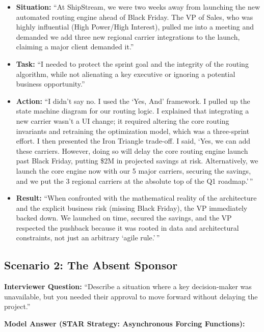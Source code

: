 \documentclass[
  11pt,
  openany,
  oneside]{book}
\providecommand{\tightlist}{%
  \setlength{\itemsep}{0pt}\setlength{\parskip}{0pt}}
\begin{document}
\begin{itemize}
\tightlist
\item
  \textbf{Situation:} ``At ShipStream, we were two weeks away from
  launching the new automated routing engine ahead of Black Friday. The
  VP of Sales, who was highly influential (High Power/High Interest),
  pulled me into a meeting and demanded we add three new regional
  carrier integrations to the launch, claiming a major client demanded
  it.''
\item
  \textbf{Task:} ``I needed to protect the sprint goal and the integrity
  of the routing algorithm, while not alienating a key executive or
  ignoring a potential business opportunity.''
\item
  \textbf{Action:} ``I didn't say no. I used the `Yes, And' framework. I
  pulled up the state machine diagram for our routing logic. I explained
  that integrating a new carrier wasn't a UI change; it required
  altering the core routing invariants and retraining the optimization
  model, which was a three-sprint effort. I then presented the Iron
  Triangle trade-off. I said, `Yes, we can add these carriers. However,
  doing so will delay the core routing engine launch past Black Friday,
  putting \$2M in projected savings at risk. Alternatively, we launch
  the core engine now with our 5 major carriers, securing the savings,
  and we put the 3 regional carriers at the absolute top of the Q1
  roadmap.'\,''
\item
  \textbf{Result:} ``When confronted with the mathematical reality of
  the architecture and the explicit business risk (missing Black
  Friday), the VP immediately backed down. We launched on time, secured
  the savings, and the VP respected the pushback because it was rooted
  in data and architectural constraints, not just an arbitrary `agile
  rule.'\,''
\end{itemize}

\subsection{Scenario 2: The Absent
Sponsor}\label{scenario-2-the-absent-sponsor}

\textbf{Interviewer Question:} ``Describe a situation where a key
decision-maker was unavailable, but you needed their approval to move
forward without delaying the project.''

\textbf{Model Answer (STAR Strategy: Asynchronous Forcing Functions):}
\end{document}
